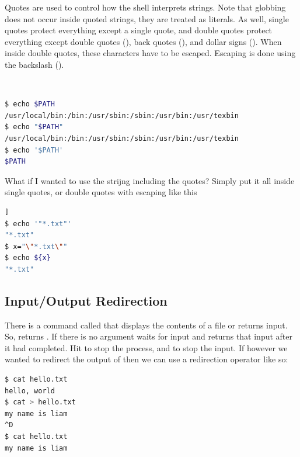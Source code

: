 \documentclass[english, 11pt]{article}
\begin{document}
  Quotes are used to control how the shell interprets strings. Note that globbing does not occur inside quoted strings, they are treated as literals. As well, single quotes protect everything except a single quote, and double quotes protect everything except double quotes (), back quotes (), and dollar signs (\tc{\$}). When inside double quotes, these characters have to be escaped. Escaping is done using the backslash ().

  \begin{exmp}
  \
  \begin{lstlisting}[language=bash,numbers=none]
$ echo $PATH
/usr/local/bin:/bin:/usr/sbin:/sbin:/usr/bin:/usr/texbin
$ echo "$PATH"
/usr/local/bin:/bin:/usr/sbin:/sbin:/usr/bin:/usr/texbin
$ echo '$PATH'
$PATH
  \end{lstlisting}
  \end{exmp}

  What if I wanted to use the strijng  including the quotes? Simply put it all inside single quotes, or double quotes with escaping like this
  \begin{lstlisting}[language=bash,numbers=none]]
$ echo '"*.txt"'
"*.txt"
$ x="\"*.txt\""
$ echo ${x}
"*.txt"
  \end{lstlisting}

  \subsection{Input/Output Redirection}
  There is a command called  that displays the contents of a file or returns input. So,  returns . If there is no argument  waits for input and returns that input after it had completed. Hit  to stop the process, and  to stop the input. If however we wanted to redirect the output of  then we can use a redirection operator like so:
  \begin{lstlisting}[language=bash,numbers=none]
$ cat hello.txt
hello, world
$ cat > hello.txt
my name is liam
^D
$ cat hello.txt
my name is liam
  \end{lstlisting}
\end{document}
